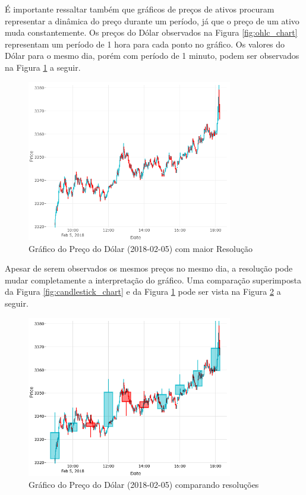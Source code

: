 \documentclass[12pt]{article}
\begin{document}
É importante ressaltar também que gráficos de preços de ativos procuram representar a dinâmica 
do preço durante um período, já que o preço de um ativo muda constantemente. Os preços do Dólar
observados na Figura \ref{fig:ohlc_chart} representam um período de 1 hora para cada ponto
no gráfico. Os valores do Dólar para o mesmo dia, porém com período de 1 minuto, podem ser
observados na Figura \ref{fig:ohlc_chart_detailed} a seguir.

\begin{figure}[H]
	\centering
	\includegraphics[width=0.8\textwidth]{ohlc_chart_detailed.png}
	\caption{Gráfico do Preço do Dólar (2018-02-05) com maior Resolução}
	\label{fig:ohlc_chart_detailed}
\end{figure}

Apesar de serem observados os mesmos preços no mesmo dia, a resolução pode mudar completamente
a interpretação do gráfico. Uma comparação superimposta da Figura \ref{fig:candlestick_chart}
e da Figura \ref{fig:ohlc_chart_detailed} pode ser vista na
Figura \ref{fig:ohlc_chart_detailed_superimposed} a seguir.

\begin{figure}[H]
	\centering
	\includegraphics[width=0.8\textwidth]{ohlc_chart_detailed_superimposed.png}
	\caption{Gráfico do Preço do Dólar (2018-02-05) comparando resoluções}
	\label{fig:ohlc_chart_detailed_superimposed}
\end{figure}
\end{document}
